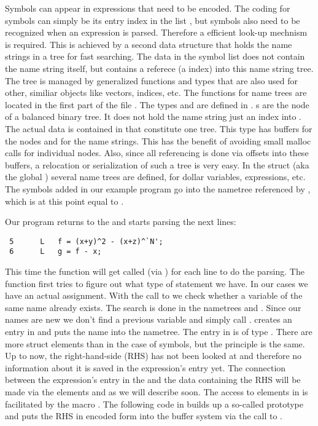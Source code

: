 Symbols can appear in expressions that need to be encoded. The coding for
symbols can simply be its entry index in the list , but symbols
also need to be recognized when an expression is parsed. Therefore a efficient
look-up mechnism is required. This is achieved by a second data structure that
holds the name strings in a tree for fast searching. The data in the symbol list
does not contain the name string itself, but contains a referece (a index) into
this name string tree. The tree is managed by generalized functions and types
that are also used for other, similiar objects like vectors, indices, etc. The
functions for name trees are located in the first part of the file .
The types  and  are defined in .
s are the node of a balanced binary tree. It does not hold the
name string just an index into . The actual data is contained in 
 that constitute one tree. This type has buffers for the nodes and
for the name strings. This has the benefit of avoiding small malloc calls for
individual nodes. Also, since all referencing is done via offsets into these
buffers, a relocation or serialization of such a tree is very easy. In the
struct  (aka the global ) several name trees are defined, for
dollar variables, expressions, etc. The symbols added in our example program go
into the nametree referenced by , which is at this point equal
to .

Our program returns to the  and starts parsing the next lines:

\begin{verbatim}
 5      L	f = (x+y)^2 - (x+z)^`N';
 6      L	g = f - x;
\end{verbatim}

This time the function  will get called (via ) for each
line to do the parsing.  The function  first tries to figure out
what type of  statement we have. In our cases we have an actual
assignment. With the call to  we check whether a variable of the same
name already exists. The search is done in the nametrees  and
. Since our names are new we don't find a previous variable and
simply call .  creates an entry in 
and puts the name into the  nametree. The entry in
 is of type . There are more struct
elements than in the case of symbols, but the principle is the same. Up to now,
the right-hand-side (RHS) has not been looked at and therefore no information
about it is saved in the expression's entry yet. The connection between the
expression's entry in the  and the data containing the RHS
will be made via the elements  and  as we will describe
soon.  The access to elements in  is facilitated by the
macro . The following code in  builds up a so-called
prototype and puts the RHS in encoded form into the buffer system via the call
to .

